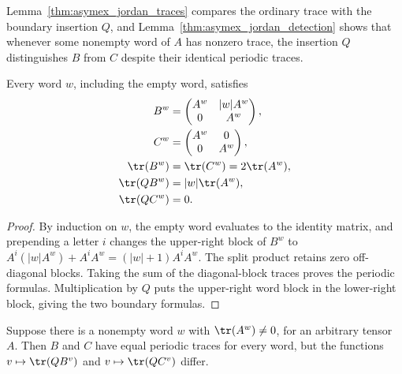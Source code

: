 Lemma~\ref{thm:asymex_jordan_traces} compares the ordinary trace with
the boundary insertion $Q$, and
Lemma~\ref{thm:asymex_jordan_detection} shows that whenever some
nonempty word of $A$ has nonzero trace, the insertion $Q$ distinguishes
$B$ from $C$ despite their identical periodic traces.

\begin{lemma}
    \label{thm:asymex_jordan_traces}
    \leanok
    Every word $w$, including the empty word, satisfies
    \begin{align}
        B^w       & =\begin{pmatrix}A^w&|w|A^w\\0&A^w\end{pmatrix}, \\
        C^w       & =\begin{pmatrix}A^w&0\\0&A^w\end{pmatrix},      \\
        \tr(B^w)  & =\tr(C^w)=2\tr(A^w),                            \\
        \tr(QB^w) & =|w|\tr(A^w),                                   \\
        \tr(QC^w) & =0.
    \end{align}
\end{lemma}

\begin{proof}
    \leanok
    By induction on $w$, the empty word evaluates to the identity matrix,
    and prepending a letter $i$ changes the upper-right block of $B^w$
    to $A^i(|w|A^w)+A^iA^w=(|w|+1)A^iA^w$.
    The split product retains zero off-diagonal blocks.
    Taking the sum of the diagonal-block traces proves the periodic
    formulas. Multiplication by $Q$ puts the upper-right word block
    in the lower-right block, giving the two boundary formulas.
\end{proof}

\begin{lemma}
    \label{thm:asymex_jordan_detection}
    \leanok
    Suppose there is a nonempty word $w$ with $\tr(A^w)\neq0$, for an
    arbitrary tensor $A$. Then $B$ and $C$ have equal periodic traces for
    every word, but the functions $v\mapsto\tr(QB^v)$ and
    $v\mapsto\tr(QC^v)$ differ.
\end{lemma}

